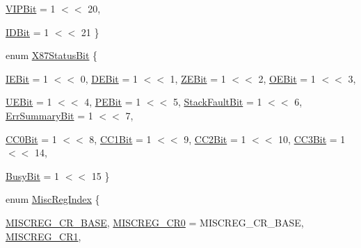 \begin{DoxyCompactItemize}
\hyperlink{namespaceX86ISA_a62679c97fcb78e0d10a9d535fa1872ffab94d5d1aec4ee1664c7615d4c1b60d39}{VIPBit} =  1 $<$$<$ 20, 
\par
\hyperlink{namespaceX86ISA_a62679c97fcb78e0d10a9d535fa1872ffa708843e6b5d83ba24503582c458b14d1}{IDBit} =  1 $<$$<$ 21
 \}
\item 
enum \hyperlink{namespaceX86ISA_a56ab3d4ef473ec7adc4ddeac60582b25}{X87StatusBit} \{ \par
\hyperlink{namespaceX86ISA_a56ab3d4ef473ec7adc4ddeac60582b25a119d3962ccfe00f78727003a7c1ed4bf}{IEBit} =  1 $<$$<$ 0, 
\hyperlink{namespaceX86ISA_a56ab3d4ef473ec7adc4ddeac60582b25a8255af4cbacecb05af1d66ab1fcebb31}{DEBit} =  1 $<$$<$ 1, 
\hyperlink{namespaceX86ISA_a56ab3d4ef473ec7adc4ddeac60582b25a842013f850da4678aa5982306db0bde1}{ZEBit} =  1 $<$$<$ 2, 
\hyperlink{namespaceX86ISA_a56ab3d4ef473ec7adc4ddeac60582b25ac85c84074f4cf51b9dd1ebdd34f25a63}{OEBit} =  1 $<$$<$ 3, 
\par
\hyperlink{namespaceX86ISA_a56ab3d4ef473ec7adc4ddeac60582b25a46546565841875c3a57a0ba61fca8957}{UEBit} =  1 $<$$<$ 4, 
\hyperlink{namespaceX86ISA_a56ab3d4ef473ec7adc4ddeac60582b25af9baebd25f57192bc0d77906466bb100}{PEBit} =  1 $<$$<$ 5, 
\hyperlink{namespaceX86ISA_a56ab3d4ef473ec7adc4ddeac60582b25ac2d1705a732b243835d1187299b5681c}{StackFaultBit} =  1 $<$$<$ 6, 
\hyperlink{namespaceX86ISA_a56ab3d4ef473ec7adc4ddeac60582b25a9a42c69561648f78d25c754728ee1b35}{ErrSummaryBit} =  1 $<$$<$ 7, 
\par
\hyperlink{namespaceX86ISA_a56ab3d4ef473ec7adc4ddeac60582b25ab25df8150146507436ea3de82b14b2c2}{CC0Bit} =  1 $<$$<$ 8, 
\hyperlink{namespaceX86ISA_a56ab3d4ef473ec7adc4ddeac60582b25a5b2388f8cda2c2655e35384da4b93c32}{CC1Bit} =  1 $<$$<$ 9, 
\hyperlink{namespaceX86ISA_a56ab3d4ef473ec7adc4ddeac60582b25af6994130984a4272ffde3f8f31a20d16}{CC2Bit} =  1 $<$$<$ 10, 
\hyperlink{namespaceX86ISA_a56ab3d4ef473ec7adc4ddeac60582b25ad74f69c75aed13485540849f7b86efb8}{CC3Bit} =  1 $<$$<$ 14, 
\par
\hyperlink{namespaceX86ISA_a56ab3d4ef473ec7adc4ddeac60582b25a6134a1cdf75ea277941c7fd62961f7e2}{BusyBit} =  1 $<$$<$ 15
 \}
\item 
enum \hyperlink{namespaceX86ISA_a1e522017e015d4c7efd6b2360143aa67}{MiscRegIndex} \{ \par
\hyperlink{namespaceX86ISA_a1e522017e015d4c7efd6b2360143aa67af402e135755c7918d2f5f3279d3e95d4}{MISCREG\_\-CR\_\-BASE}, 
\hyperlink{namespaceX86ISA_a1e522017e015d4c7efd6b2360143aa67ada26b29c24bab13bc6d77060ba44fb33}{MISCREG\_\-CR0} =  MISCREG\_\-CR\_\-BASE, 
\hyperlink{namespaceX86ISA_a1e522017e015d4c7efd6b2360143aa67a64253154778b11a8cd9dd197db130960}{MISCREG\_\-CR1}, 
$$
\end{DoxyCompactItemize}
